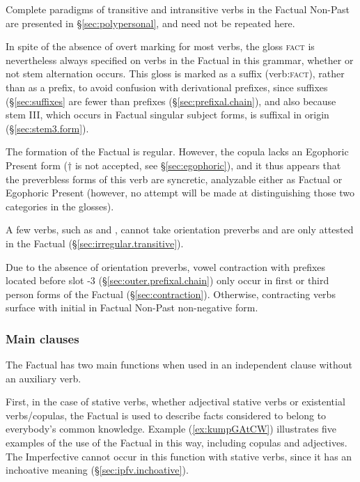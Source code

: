 Complete paradigms of transitive and intransitive verbs in the Factual Non-Past are presented in §\ref{sec:polypersonal}, and need not be repeated here.

In spite of the absence of overt marking for most verbs, the gloss \textsc{fact} is nevertheless always specified on verbs in the Factual in this grammar, whether or not stem alternation occurs. This gloss is marked as a suffix (verb:\textsc{fact}), rather than as a prefix, to avoid confusion with derivational prefixes, since suffixes (§\ref{sec:suffixes} are fewer than prefixes (§\ref{sec:prefixal.chain}), and also because stem III, which occurs in Factual singular subject forms, is suffixal in origin (§\ref{sec:stem3.form}).

The formation of the Factual is regular. However, the copula  lacks an Egophoric Present form ($\dagger$ is not accepted, see §\ref{sec:egophoric}), and it thus appears that the preverbless forms of this verb are syncretic, analyzable either as Factual or Egophoric Present (however, no attempt will be made at distinguishing those two categories in the glosses).

A few verbs, such as  and , cannot take orientation preverbs and are only attested in the Factual (§\ref{sec:irregular.transitive}).


Due to the absence of orientation preverbs, vowel contraction with prefixes located before slot -3 (§\ref{sec:outer.prefixal.chain}) only occur in first or third person forms of the Factual (§\ref{sec:contraction}). Otherwise, contracting verbs surface with initial  in Factual Non-Past non-negative form.
 
\subsubsection{Main clauses} \label{sec:fact.main.clauses}
The Factual has two main functions when used in an independent clause without an auxiliary verb. 

First,  in the case of stative verbs, whether adjectival stative verbs or existential verbs/copulas, the Factual is used to describe facts considered to belong to everybody's common knowledge. Example (\ref{ex:kumpGAtCW}) illustrates five examples of the use of the Factual in this way, including copulas and adjectives. The Imperfective cannot occur in this function with stative verbs, since it has an inchoative meaning (§\ref{sec:ipfv.inchoative}).


